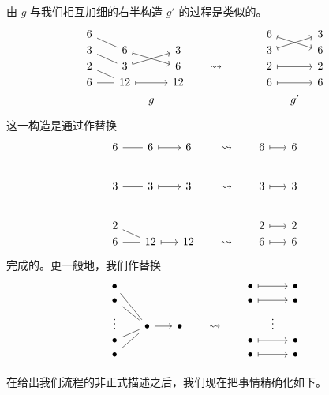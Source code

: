由 $g$ 与我们相互加细的右半构造 $g'$ 的过程是类似的。
\[
\begin{tikzcd}[row sep = 1,column sep = 8]
6 \ar[drr,-] & &    & &    & & & & & & 6 \ar[drr,mapsto] & & 3\\
3 \ar[drr,-] & & 6  \ar[drr,mapsto] & & 3  & & & & & & 3 \ar[urr,mapsto] & & 6\\
2 \ar[drr,-] & & 3  \ar[urr,mapsto] & & 6  & & \rightsquigarrow & & & & 2 \ar[rr,mapsto] & & 2\\
6 \ar[rr,-] & & 12 \ar[rr,mapsto] & & 12 & & & & & & 6 \ar[rr,mapsto] & & 6\\
  & &    &g&    & & & & & &   &g'& \\
\end{tikzcd}
\]
这一构造是通过作替换
\[ \begin{tikzcd} [row sep = 1, column sep = 8]
6 \ar[rr,-] & & 6  \ar[rr,mapsto] & & 6 & & \rightsquigarrow & & 6 \ar[rr,mapsto] & & 6\\
& & & & & & & & & & \\[2em]
3 \ar[rr,-] & & 3  \ar[rr,mapsto] & & 3 & & \rightsquigarrow & & 3 \ar[rr,mapsto] & & 3\\
& & & & & & & & & & \\[2em]
2 \ar[rrd,-] & & & & & & & &2 \ar[rr,mapsto] & & 2\\
6 \ar[rr,-] & & 12 \ar[rr,mapsto] & & 12 & & \rightsquigarrow & & 6 \ar[rr,mapsto] & & 6\\
\end{tikzcd} \]
完成的。更一般地，我们作替换
\[ \begin{tikzcd} [row sep = 1, column sep = 8]
\bullet \ar[ddrr,-] & & & & & & & & \bullet \ar[rr,mapsto] & & \bullet \\
\bullet \ar[drr,-]  & & & & & & & & \bullet \ar[rr,mapsto] & & \bullet \\
\vdots              & & \bullet \ar[rr,mapsto] & & \bullet & & \rightsquigarrow & & & \vdots & \\
\bullet \ar[urr,-]  & &  & & & & & &  \bullet \ar[rr,mapsto] & & \bullet \\
\bullet \ar[uurr,-] & & & & & & & & \bullet \ar[rr,mapsto]  & & \bullet \\
\end{tikzcd} \]

在给出我们流程的非正式描述之后，我们现在把事情精确化如下。


